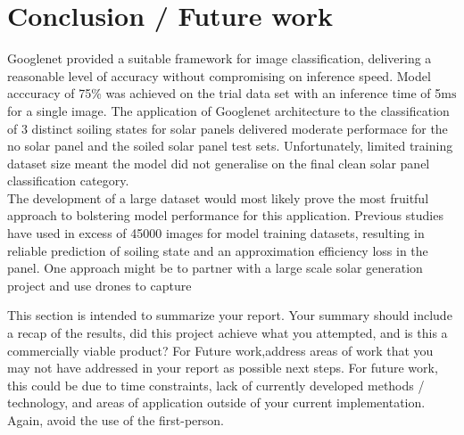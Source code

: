 \documentclass[10pt,journal,compsoc]{IEEEtran}
\begin{document}
		\section{Conclusion / Future work}
		Googlenet provided a suitable framework for image classification, delivering a reasonable level of accuracy without compromising on inference speed. Model acccuracy of 75\% was achieved on the trial data set with an inference time of 5$\si{\milli\second}$ for a single image. The application of Googlenet architecture to the classification of 3 distinct soiling states for solar panels delivered moderate performace for the no solar panel and the soiled solar panel test sets. Unfortunately, limited training dataset size meant the model did not generalise on the final clean solar panel classification category.\\
		
		The development of a large dataset would most likely prove the most fruitful approach to bolstering model performance for this application. Previous studies have used in excess of 45000 images for model training datasets, resulting in reliable prediction of soiling state and an approximation efficiency loss in the panel. One approach might be to partner with a large scale solar generation project and use drones to capture 
		
		This section is intended to summarize your report. Your summary should include a recap of the results, did this project achieve what you attempted, and is this a commercially viable product? 
		For Future work,address areas of work that you may not have addressed in your report as possible next steps. For future work, this could be due to time constraints, lack of currently developed methods / technology, and areas of application outside of your current implementation. Again, avoid the use of the first-person.
			
		
		
			
\end{document}
